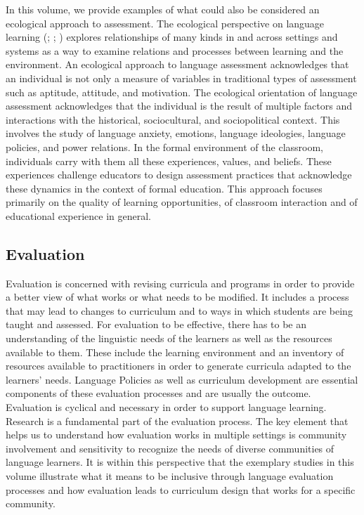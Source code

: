 \documentclass[output=paper]{langscibook}
\begin{document}
In this volume, we provide examples of what could also be considered an ecological approach to assessment. The ecological perspective on language learning (\citealt{Larsen-Freeman2017}; \citealt{VanLier2010}; \citealt{VanLier1997}) explores relationships of many kinds in and across settings and systems as a way to examine relations and processes between learning and the environment. An ecological approach to language assessment acknowledges that an individual is not only a measure of variables in traditional types of assessment such as aptitude, attitude, and motivation. The ecological orientation of language assessment acknowledges that the individual is the result of multiple factors and interactions with the historical, sociocultural, and sociopolitical context. This involves the study of language anxiety, emotions, language ideologies, language policies, and power relations. In the formal environment of the classroom, individuals carry with them all these experiences, values, and beliefs. These experiences challenge educators to design assessment practices that acknowledge these dynamics in the context of formal education. This approach focuses primarily on the quality of learning opportunities, of classroom interaction and of educational experience in general.



\subsection{Evaluation}



  Evaluation is concerned with revising curricula and programs in order to provide a better view of what works or what needs to be modified. It includes a process that may lead to changes to curriculum and to ways in which students are being taught and assessed. For evaluation to be effective, there has to be an understanding of the linguistic needs of the learners as well as the resources available to them. These include the learning environment and an inventory of resources available to practitioners in order to generate curricula adapted to the learners’ needs. Language Policies as well as curriculum development are essential components of these evaluation processes and are usually the outcome. Evaluation is cyclical and necessary in order to support language learning. Research is a fundamental part of the evaluation process. The key element that helps us to understand how evaluation works in multiple settings is community involvement and sensitivity to recognize the needs of diverse communities of language learners. It is within this perspective that the exemplary studies in this volume illustrate what it means to be inclusive through language evaluation processes and how evaluation leads to curriculum design that works for a specific community.
\end{document}
